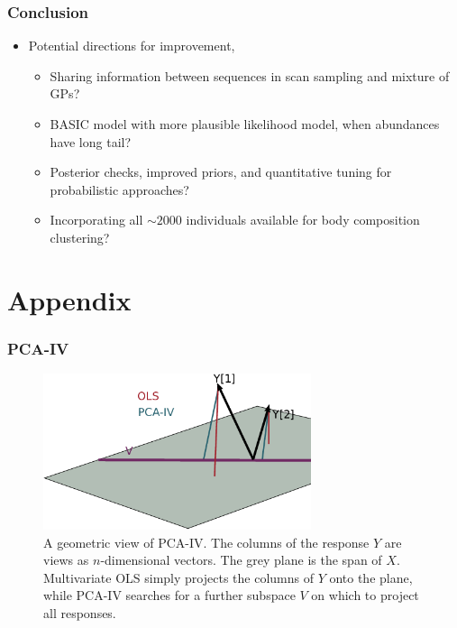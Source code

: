 \documentclass{beamer}
\begin{document}
\begin{frame}
  \frametitle{Conclusion}
  \begin{itemize}
  \item Potential directions for improvement,
    \begin{itemize}
    \item Sharing information between sequences in scan sampling and mixture of GPs?
    \item BASIC model with more plausible likelihood model, when abundances have long tail?
    \item Posterior checks, improved priors, and quantitative tuning for
      probabilistic approaches?
    \item Incorporating all $\sim 2000$ individuals available for body
      composition clustering?
    \end{itemize}
  \end{itemize}
\end{frame}




\section{Appendix}
\label{sec:Appendix}

\begin{frame}
  \frametitle{PCA-IV}
\begin{figure}
  \centering
  \includegraphics[width=0.7\textwidth]{figure/pca_iv_geometry}
  \caption{A geometric view of PCA-IV. The columns of the response $Y$ are views
    as $n$-dimensional vectors. The grey plane is the span of
    $X$. Multivariate OLS simply projects the columns of $Y$ onto the plane,
    while PCA-IV searches for a further subspace $V$ on which to project all
    responses. \label{fig:pca_iv_geometry} }
\end{figure}
\end{frame}
\end{document}
